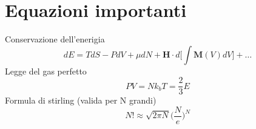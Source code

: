 \documentclass[10pt,a4paper]{article}
\begin{document}
\section{Equazioni importanti}
Conservazione dell'enerigia
\begin{equation}
	dE=TdS-PdV+\mu dN+ \mathbf H\cdot d\bigg[\int \mathbf M(V)dV\bigg]+\dots
\end{equation}
Legge del gas perfetto
\begin{equation}
	PV=Nk_bT=\frac23E
\end{equation}
Formula di stirling (valida per N grandi)
\begin{equation}
	N! \approx \sqrt{2\pi N}\bigg(\frac Ne\bigg)^N
\end{equation}
\end{document}
